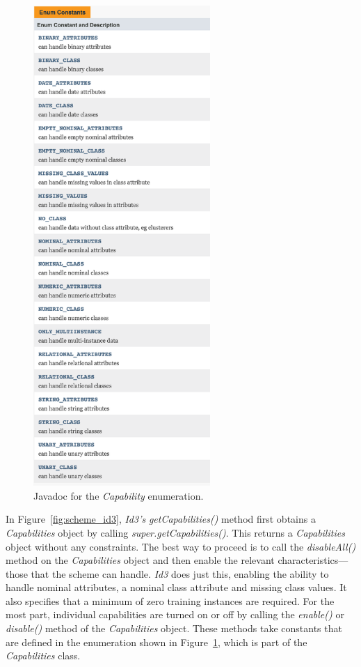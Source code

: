 \begin{figure}[!th]
\centering
\includegraphics[width=0.6\textwidth]{images/B7_3.png}
\caption{Javadoc for the \textit{Capability} enumeration.}
\label{fig:javadoc_capability}
\end{figure}


In Figure~\ref{fig:scheme_id3}, \textit{Id3's} \textit{getCapabilities()} method first obtains a
\textit{Capabilities} object by calling \textit{super.getCapabilities()}. This returns a
\textit{Capabilities} object without any constraints. The best way to proceed
is to call the \textit{disableAll()} method on
the \textit{Capabilities} object and then enable the relevant
characteristics---those that the scheme can handle. \textit{Id3} does
just this, enabling the ability to handle nominal attributes, a
nominal class attribute and missing class values. It also specifies
that a minimum of zero training instances are required. For the most
part, individual capabilities are turned on or off by calling
the \textit{enable()} or \textit{disable()} method of
the \textit{Capabilities} object. These methods take constants that
are defined in the enumeration shown in
Figure~\ref{fig:javadoc_capability}, which is part of
the \textit{Capabilities} class.
